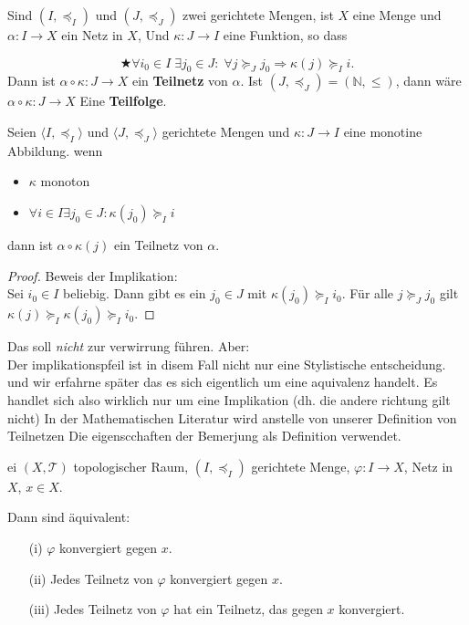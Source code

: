 {
Sind $(I, \preceq_I)$ und $(J, \preceq_J)$ zwei gerichtete Mengen,
ist $X$ eine Menge und $\alpha : I \to X$ ein Netz in $X$, 
Und $\kappa : J \to I$ eine Funktion, so dass
 
$$
\bigstar
\forall i_0 \in I \; \exists j_0 \in J : \; \forall j \succeq_J j_0
\Rightarrow \kappa(j) \succeq_I i .
$$
Dann ist $\alpha \circ \kappa : J \to X$ ein \textbf{Teilnetz} von $\alpha$.
Ist $(J, \preceq_J) = (\mathbb{N}, \leq)$, 
dann wäre $\alpha \circ \kappa : J \to X$ Eine \textbf{Teilfolge}.
}
\nt
{ 
    Seien $\langle I, \preceq_I \rangle$ und $\langle J, \preceq_J \rangle$ 
    gerichtete Mengen und $\kappa : J \to I$ eine monotine Abbildung.
    wenn 
    \begin{itemize}
        \item $\kappa$ monoton
        \item $\forall i \in I \exists j_0 \in J: \kappa(j_0) \succeq_I i$
    \end{itemize}
    dann ist $\alpha \circ \kappa(j) $ ein Teilnetz von $\alpha$.

    \begin{proof}{Beweis der Implikation:}\\
        Sei $i_0 \in I$ beliebig. Dann gibt es ein $j_0 \in J$ mit 
        $\kappa(j_0) \succeq_I i_0$. Für alle $j \succeq_J j_0$ gilt
        $\kappa(j) \succeq_I \kappa(j_0) \succeq_I i_0$.
    \end{proof}
}

Das soll \emph{nicht} zur verwirrung führen. Aber:\\
Der implikationspfeil ist in disem Fall nicht nur eine Stylistische entscheidung.
und wir erfahrne später das es sich eigentlich um eine aquivalenz handelt. 
Es handlet sich also wirklich nur um eine Implikation (dh. die andere richtung
gilt nicht) 
In der Mathematischen Literatur wird anstelle von unserer 
Definition von Teilnetzen
Die eigenscchaften der Bemerjung als Definition verwendet.

\thm{}
{
    ei $(X, \mathcal{T})$ topologischer Raum, $(I, \preceq_I)$ gerichtete Menge,  
$\varphi : I \to X$, Netz in $X$, $x \in X$.  

Dann sind äquivalent:

\begin{enumerate}
\item[(i)] $\varphi$ konvergiert gegen $x$.
\item[(ii)] Jedes Teilnetz von $\varphi$ konvergiert gegen $x$.
\item[(iii)] Jedes Teilnetz von $\varphi$ hat ein Teilnetz, das gegen $x$ konvergiert.
\end{enumerate}
}

